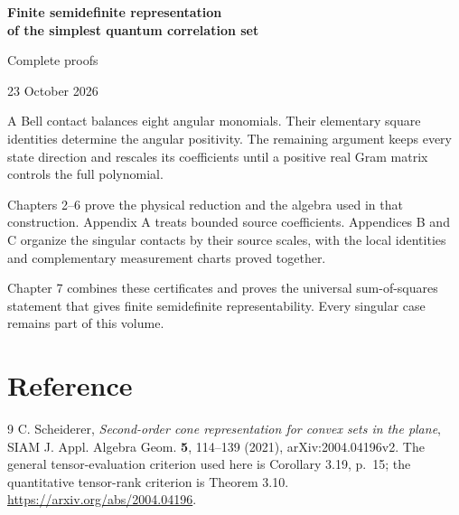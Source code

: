 \documentclass[10pt,a4paper,oneside,openany]{book}
\theoremstyle{definition}
\theoremstyle{remark}
\begin{document}
\frontmatter
\begin{titlepage}
\centering
\vspace*{25mm}
{\LARGE\bfseries Finite semidefinite representation\\[4pt]
of the simplest quantum correlation set\par}
\vspace{16mm}
{\Huge Complete proofs\par}
\vspace{12mm}
{\large 23 October 2026\par}
\vfill
\begin{minipage}{0.88\textwidth}
A Bell contact balances eight angular monomials. Their elementary
square identities determine the angular positivity. The remaining
argument keeps every state direction and rescales its coefficients
until a positive real Gram matrix controls the full polynomial.

\medskip
Chapters 2--6 prove the physical reduction and the algebra used in
that construction. Appendix A treats bounded source coefficients.
Appendices B and C organize the singular contacts by their source
scales, with the local identities and complementary measurement
charts proved together.

\medskip
Chapter 7 combines these certificates and proves the universal
sum-of-squares statement that gives finite semidefinite
representability. Every singular case remains part of this volume.
\end{minipage}
\end{titlepage}
\tableofcontents
\mainmatter







\appendix

\backmatter
\chapter{Reference}
\begingroup
\let\chapter\section
\begin{thebibliography}{9}
C. Scheiderer, \emph{Second-order cone representation for convex sets
in the plane}, SIAM J. Appl. Algebra Geom. \textbf{5}, 114--139 (2021),
arXiv:2004.04196v2.
The general tensor-evaluation criterion used here is Corollary 3.19,
p.~15; the quantitative tensor-rank criterion is Theorem 3.10.
\url{https://arxiv.org/abs/2004.04196}.
\end{thebibliography}
\endgroup
\end{document}
